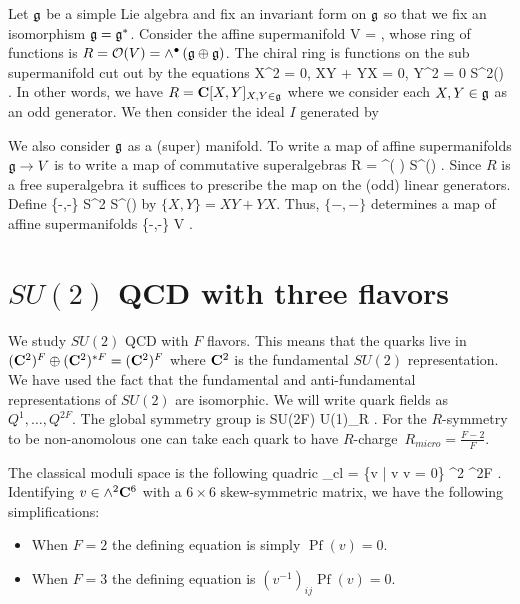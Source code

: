 \documentclass[11pt]{amsart}
\renewcommand{\op}{\operatorname}
\begin{document}
Let $\mathfrak{g}$ be a simple Lie algebra and fix an invariant form on $\mathfrak{g}$ so that we fix an isomorphism $\mathfrak{g} = \mathfrak{g}^*$.
Consider the affine supermanifold
\beqn
V = \Pi {} \oplus \Pi {} ,
\eeqn
whose ring of functions is $R = \mathcal O(V) = \wedge^\bullet \left(\mathfrak{g} \oplus \mathfrak{g}\right)$.
The chiral ring is functions on the sub supermanifold cut out by the equations
\beqn
X^2 = 0, XY + YX = 0, Y^2 = 0 \in S^2() .
\eeqn
In other words, we have $R = \mathbf{C}[X,Y]_{X,Y \in \mathfrak{g}}$ where we consider each $X,Y \in \mathfrak{g}$ as an odd generator.
We then consider the ideal $I$ generated by 

We also consider $\mathfrak{g}$ as a (super) manifold.
To write a map of affine supermanifolds $\mathfrak{g} \to V$
is to write a map of commutative superalgebras
\beqn
R = \wedge^\bu ( \oplus {}) \to S^\bu () .
\eeqn
Since $R$ is a free superalgebra it suffices to prescribe the map on the (odd) linear generators.
Define
\beqn
\{-,-\} \colon {} \oplus {} \to S^2  \subset S^\bu () 
\eeqn
by $\{X,Y\} = XY + YX$.
Thus, $\{-,-\}$ determines a map of affine supermanifolds
\beqn
\{-,-\} \colon {} \to V .
\eeqn

\section{$SU(2)$ QCD with three flavors}

We study $SU(2)$ QCD with $F$ flavors.
This means that the quarks live in $(\mathbf{C}^2)^F \oplus (\mathbf{C}^2)^{* F} = (\mathbf{C}^2)^F$ where $\mathbf{C}^2$ is the fundamental $SU(2)$ representation.
We have used the fact that the fundamental and anti-fundamental representations of $SU(2)$ are isomorphic.
We will write quark fields as $Q^1,\ldots,Q^{2F}$.
The global symmetry group is
\beqn
SU(2F) \times U(1)_R .
\eeqn
For the $R$-symmetry to be non-anomolous one can take each quark to have $R$-charge~$R_{micro} = \frac{F-2}{F}$.

The classical moduli space is the following quadric
\beqn
\cM_{cl} = \{v \; | \; v \wedge v = 0\} \subset \wedge^2 \C^{2F} .
\eeqn
Identifying $v \in \wedge^2 \mathbf{C}^6$ with a $6 \times 6$ skew-symmetric matrix, we have the following simplifications:
\begin{itemize}
\item When $F = 2$ the defining equation is simply $\op{Pf}(v) = 0$.
\item When $F = 3$ the defining equation is $(v^{-1})_{ij} \op{Pf}(v) = 0$.
\end{itemize}
\end{document}
